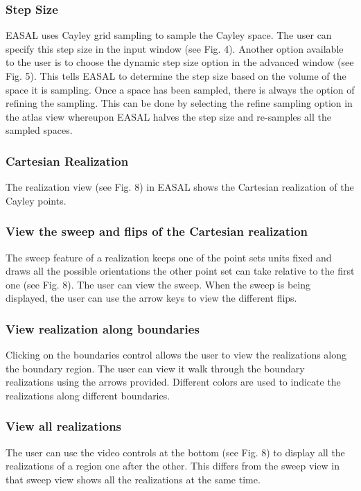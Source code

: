 \documentclass[10pt]{article}
\begin{document}
\subsubsection{Step Size}
EASAL uses Cayley grid sampling to sample the Cayley space. The user can specify this step size in the
input window (see Fig. 4). Another option available to the user is to choose the dynamic step size option in
the advanced window (see Fig. 5). This tells EASAL to determine the step size based on the volume of the
space it is sampling. Once a space has been sampled, there is always the option of refining the sampling.
This can be done by selecting the refine sampling option in the atlas view whereupon EASAL halves the
step size and re-samples all the sampled spaces.

\subsubsection{Cartesian Realization}
The realization view (see Fig. 8) in EASAL shows the Cartesian realization of the Cayley points.

\subsubsection{View the sweep and flips of the Cartesian realization}
The sweep feature of a realization keeps one of the point sets units fixed and draws all the possible orientations
the other point set can take relative to the first one (see Fig. 8). The user can view the sweep. When the
sweep is being displayed, the user can use the arrow keys to view the different flips.

\subsubsection{View realization along boundaries}
Clicking on the boundaries control allows the user to view the realizations along the boundary region. The
user can view it walk through the boundary realizations using the arrows provided. Different colors are used
to indicate the realizations along different boundaries.

\subsubsection{View all realizations}
The user can use the video controls at the bottom (see Fig. 8) to display all the realizations of a region one
after the other. This differs from the sweep view in that sweep view shows all the realizations at the same
time.
\end{document}
